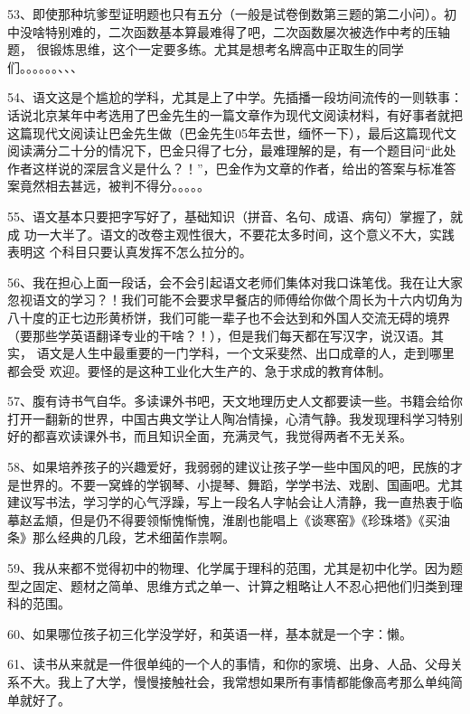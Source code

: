 \documentclass[11pt]{ctexart}
\begin{document}
{{{{53、即使那种坑爹型证明题也只有五分（一般是试卷倒数第三题的第二小问）。初
中没啥特别难的，二次函数基本算最难得了吧，二次函数屡次被选作中考的压轴题，
很锻炼思维，这个一定要多练。尤其是想考名牌高中正取生的同学
们。。。。。。、、、


54、语文这是个尴尬的学科，尤其是上了中学。先插播一段坊间流传的一则轶事：
话说北京某年中考选用了巴金先生的一篇文章作为现代文阅读材料，有好事者就把
这篇现代文阅读让巴金先生做（巴金先生05年去世，缅怀一下），最后这篇现代文
阅读满分二十分的情况下，巴金只得了七分，最难理解的是，有一个题目问“此处
作者这样说的深层含义是什么？！”，巴金作为文章的作者，给出的答案与标准答
案竟然相去甚远，被判不得分。。。。。


55、语文基本只要把字写好了，基础知识（拼音、名句、成语、病句）掌握了，就成
功一大半了。语文的改卷主观性很大，不要花太多时间，这个意义不大，实践表明这
个科目只要认真发挥不怎么拉分的。


56、我在担心上面一段话，会不会引起语文老师们集体对我口诛笔伐。我在让大家
忽视语文的学习？！我们可能不会要求早餐店的师傅给你做个周长为十六内切角为
八十度的正七边形黄桥饼，我们可能一辈子也不会达到和外国人交流无碍的境界
（要那些学英语翻译专业的干啥？！），但是我们每天都在写汉字，说汉语。其实，
语文是人生中最重要的一门学科，一个文采斐然、出口成章的人，走到哪里都会受
欢迎。要怪的是这种工业化大生产的、急于求成的教育体制。


57、腹有诗书气自华。多读课外书吧，天文地理历史人文都要读一些。书籍会给你
打开一翻新的世界，中国古典文学让人陶冶情操，心清气静。我发现理科学习特别
好的都喜欢读课外书，而且知识全面，充满灵气，我觉得两者不无关系。


58、如果培养孩子的兴趣爱好，我弱弱的建议让孩子学一些中国风的吧，民族的才
是世界的。不要一窝蜂的学钢琴、小提琴、舞蹈，学学书法、戏剧、国画吧。尤其
建议写书法，学习学的心气浮躁，写上一段名人字帖会让人清静，我一直热衷于临
摹赵孟頫，但是仍不得要领惭愧惭愧，淮剧也能唱上《谈寒窑》《珍珠塔》《买油
条》那么经典的几段，艺术细菌作祟啊。


59、我从来都不觉得初中的物理、化学属于理科的范围，尤其是初中化学。因为题
型之固定、题材之简单、思维方式之单一、计算之粗略让人不忍心把他们归类到理
科的范围。


60、如果哪位孩子初三化学没学好，和英语一样，基本就是一个字：懒。

61、读书从来就是一件很单纯的一个人的事情，和你的家境、出身、人品、父母关
系不大。我上了大学，慢慢接触社会，我常想如果所有事情都能像高考那么单纯简
单就好了。


}}}}
\end{document}
